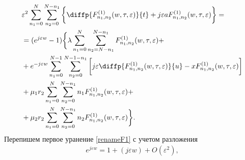 \begin{equation}
\begin{split}
		&\varepsilon^{2}\sum_{n_1=0}^N\sum_{n_2=0}^{N-n_1}\bigg\{ \diffp{F_{n_1,n_2}^{(1)}(w,\tau,\varepsilon)}{t}+j\varepsilon a F_{n_1,n_2}^{(1)}(w,\tau,\varepsilon)\bigg\}=\\
		&=(e^{j\varepsilon w} - 1)\bigg\{\lambda \sum_{n_1=0}^N\sum_{n_2=N-n_1}^{N-n_1} 
		F_{n_1, n_2}^{(1)}(w,\tau,\varepsilon)+\\
		&+e^{-j\varepsilon w} \sum_{n_1=0}^{N-1}\sum_{n_2=0}^{N-1-n_1} 
		\bigg[ j \varepsilon \diffp{ F_{n_1, n_2}^{(1)}(w,\tau,\varepsilon)}{u}-xF_{n_1, n_2}^{(1)}(w,\tau,\varepsilon)\bigg]\\
		&+\mu_1 r_2 \sum_{n_1=0}^{N}\sum_{n_2=0}^{N-n_1} 
		n_1 F_{n_1, n_2}^{(1)}(w,\tau,\varepsilon)+\\
		&+\mu_2 r_2 \sum_{n_1=0}^{N}\sum_{n_2=0}^{N-n_1} 
		n_2 F_{n_1, n_2}^{(1)}(w,\tau,\varepsilon)\bigg\}.
	\end{split}
\end{equation}
Перепишем первое уранение  \eqref{renameF1} с учетом разложения
\begin{align}
e^{j\varepsilon w}=1+(j\varepsilon w)+O(\varepsilon^2),
\end{align}
